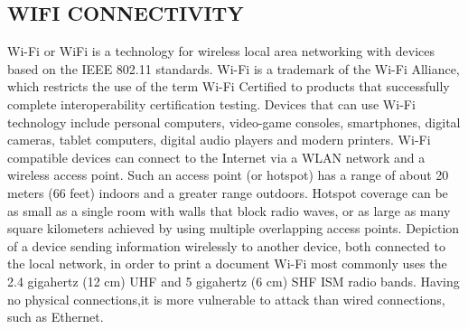 \documentclass[11pt]{report} %
\begin{document}
\subsection{WIFI CONNECTIVITY}
\label{subsec:WIFI CONNECTIVITY}
Wi-Fi or WiFi is a technology for wireless local area networking with devices based on the IEEE 802.11 standards. Wi-Fi is a trademark of the Wi-Fi Alliance, which restricts the use of the term Wi-Fi Certified to products that successfully complete interoperability certification testing.
Devices that can use Wi-Fi technology include personal computers, video-game consoles, smartphones, digital cameras, tablet computers, digital audio players and modern printers. Wi-Fi compatible devices can connect to the Internet via a WLAN network and a wireless access point. Such an access point (or hotspot) has a range of about 20 meters (66 feet) indoors and a greater range outdoors. Hotspot coverage can be as small as a single room with walls that block radio waves, or as large as many square kilometers achieved by using multiple overlapping access points.
Depiction of a device sending information wirelessly to another device, both connected to the local network, in order to print a document
Wi-Fi most commonly uses the 2.4 gigahertz (12 cm) UHF and 5 gigahertz (6 cm) SHF ISM radio bands. Having no physical connections,it is more vulnerable to attack than wired connections, such as Ethernet.
\end{document}
